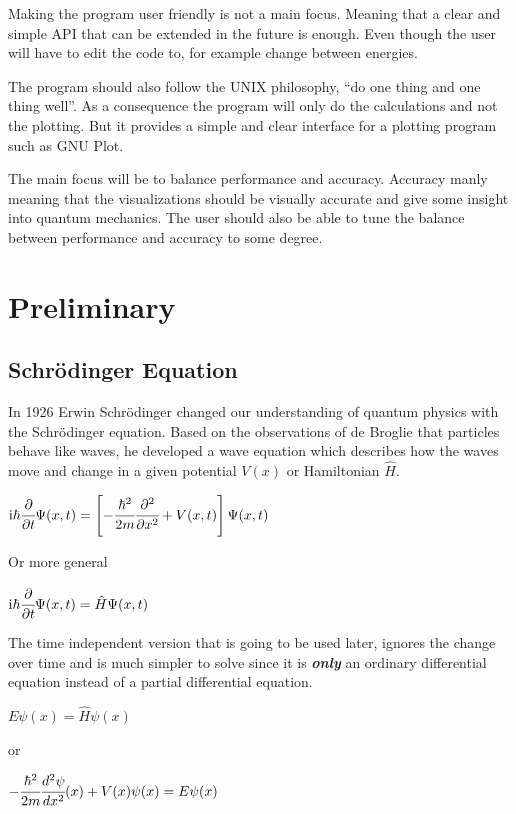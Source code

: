 \documentclass[11pt,DIV=10,final]{scrreprt} %
\newcommand{\mi}{{\text{i}}}
\begin{document}
Making the program user friendly is not a main focus. Meaning that a clear and simple API
that can be extended in the future is enough. Even though the user will have to edit the code
to, for example change between energies.

The program should also follow the UNIX philosophy, ``do one thing and one thing well''.
As a consequence the program will only do the calculations and not the plotting. But it
provides a simple and clear interface for a plotting program such as GNU Plot.

The main focus will be to balance performance and accuracy. Accuracy manly meaning that the
visualizations should be visually accurate and give some insight into quantum mechanics.
The user should also be able to tune the balance between performance and accuracy to some
degree.

\chapter{Preliminary}


\section{Schrödinger Equation}
In 1926 Erwin Schrödinger changed our understanding of quantum physics with the Schrödinger equation. Based on the observations of de Broglie that particles
behave like waves, he developed a wave equation which describes how the waves move and change in a given potential $V(x)$ or Hamiltonian $\hat{H}$.
\begin{center}
\begin{math}
  \mi\hbar {\cfrac {\partial }{\partial t}}\Psi (x,t)=\left[-{\cfrac {\hbar ^{2}}{2m}}{\cfrac {\partial ^{2}}{\partial x^{2}}}+V(x,t)\right]\Psi (x,t)
\end{math}
\end{center}
Or more general
\begin{center}
\begin{math}
  \mi\hbar {\cfrac {\partial }{\partial t}}\Psi (x,t)=\hat{H} \Psi(x,t)
\end{math}
\end{center}

The time independent version that is going to be used later, ignores the change over time and is much simpler to solve since it is \emph{\textbf{only}} an ordinary differential equation instead of a
partial differential equation.
\begin{center}
\begin{math}
  E \psi (x)=\hat{H} \psi(x)
\end{math}
\end{center}
or
\begin{center}
\begin{math}
  -{\cfrac{\hbar^{2}}{2m}}  \cfrac{d^{2} \psi}{dx^{2}} (x) + V(x) \psi(x) = E \psi(x)
\end{math}
\end{center}
\end{document}
